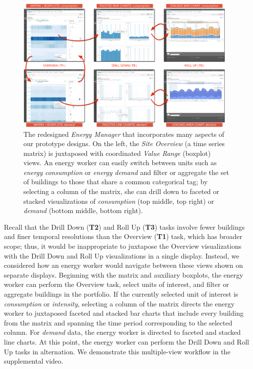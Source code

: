 \documentclass[journal]{vgtc}                %
\newcommand{\bstart}[1]{\vspace{1mm} \noindent{\textbf{#1:}}}
\begin{document}
\begin{figure}[hbp!]
    \vspace{-0.3cm}
	\centering
	\includegraphics[width=0.975\textwidth]{figures/emu.pdf}
	\vspace{-0.3cm}
	\caption{The redesigned \textsl{Energy Manager} that incorporates many aspects of our prototype designs. On the left, the \textsl{Site Overview} (a time series matrix) is juxtaposed with coordinated \textsl{Value Range} (boxplot) views. An energy worker can easily switch between units such as \textsl{energy consumption} or \textsl{energy demand} and filter or aggregate the set of buildings to those that share a common categorical tag; by selecting a column of the matrix, she can drill down to faceted or stacked visualizations of \textsl{consumption} (top middle, top right) or \textsl{demand} (bottom middle, bottom right).}
	\label{fig:emu}
\end{figure} 

\bstart{Sequenced view navigation}
Recall that the Drill Down ({\bf T2}) and Roll Up ({\bf T3}) tasks involve fewer buildings and finer temporal resolutions than the Overview ({\bf T1}) task, which has broader scope; 
thus, it would be inappropriate to juxtapose the Overview visualizations with the Drill Down and Roll Up visualizations in a single display.
Instead, we considered how an energy worker would navigate between these views shown on separate displays.
Beginning with the matrix and auxiliary boxplots, the energy worker can perform the Overview task, select units of interest, and filter or aggregate buildings in the portfolio. 
If the currently selected unit of interest is {\it consumption} or {\it intensity}, selecting a column of the matrix directs the energy worker to juxtaposed faceted and stacked bar charts that include every building from the matrix and spanning the time period corresponding to the selected column. 
For {\it demand} data, the energy worker is directed to faceted and stacked line charts.
At this point, the energy worker can perform the Drill Down and Roll Up tasks in alternation.
We demonstrate this multiple-view workflow in the supplemental video.
\end{document}
